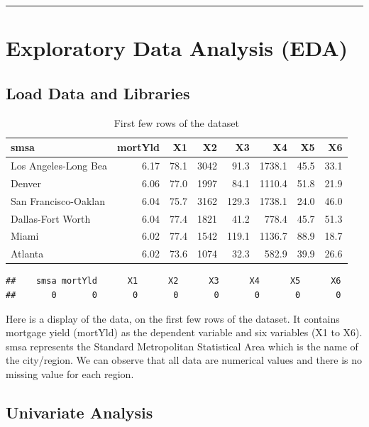 \documentclass[
  11pt,
]{article}
\begin{document}
\begin{center}\rule{0.5\linewidth}{0.5pt}\end{center}

\section{Exploratory Data Analysis
(EDA)}\label{exploratory-data-analysis-eda}

\subsection{Load Data and Libraries}\label{load-data-and-libraries}

\begin{longtable}[t]{lrrrrrrr}
\caption{\label{tab:unnamed-chunk-1}First few rows of the dataset}\\
\toprule
smsa & mortYld & X1 & X2 & X3 & X4 & X5 & X6\\
\midrule
Los Angeles-Long Bea & 6.17 & 78.1 & 3042 & 91.3 & 1738.1 & 45.5 & 33.1\\
Denver & 6.06 & 77.0 & 1997 & 84.1 & 1110.4 & 51.8 & 21.9\\
San Francisco-Oaklan & 6.04 & 75.7 & 3162 & 129.3 & 1738.1 & 24.0 & 46.0\\
Dallas-Fort Worth & 6.04 & 77.4 & 1821 & 41.2 & 778.4 & 45.7 & 51.3\\
Miami & 6.02 & 77.4 & 1542 & 119.1 & 1136.7 & 88.9 & 18.7\\
\addlinespace
Atlanta & 6.02 & 73.6 & 1074 & 32.3 & 582.9 & 39.9 & 26.6\\
\bottomrule
\end{longtable}

\begin{verbatim}
##    smsa mortYld      X1      X2      X3      X4      X5      X6 
##       0       0       0       0       0       0       0       0
\end{verbatim}

Here is a display of the data, on the first few rows of the dataset. It
contains mortgage yield (mortYld) as the dependent variable and six
variables (X1 to X6). smsa represents the Standard Metropolitan
Statistical Area which is the name of the city/region. We can observe
that all data are numerical values and there is no missing value for
each region.

\subsection{Univariate Analysis}\label{univariate-analysis}
\end{document}
